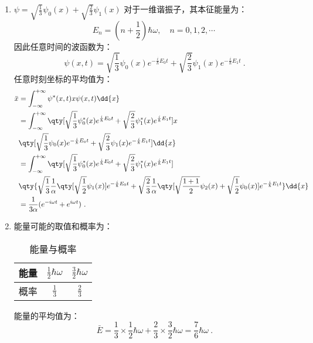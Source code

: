 \subsection{ }
\begin{enumerate}
\item $\psi=\sqrt{\frac{1}{3}}\psi_{0}(x)+\sqrt{\frac{2}{3}}\psi_{1}(x)$
对于一维谐振子，其本征能量为：
\begin{equation}
E_{n}=(n+\frac{1}{2})\hbar \omega,\quad n=0,1,2,\cdots~
\end{equation}
因此任意时间的波函数为：
\begin{equation}
\psi(x,t)=\sqrt{\frac{1}{3}}\psi_{0}(x)e^{-\frac{i}{\hbar}E_{0}t}+\sqrt{\frac{2}{3}}\psi_{1}(x)e^{-\frac{i}{\hbar}E_{1}t}~.
\end{equation}
任意时刻坐标的平均值为：
\begin{equation}
\begin{aligned}
\bar{x}&=\int^{+\infty}_{-\infty}\psi^{*}(x,t)x\psi(x,t)\dd{x} \\
&=\int^{+\infty}_{-\infty} \qty[\sqrt{\frac{1}{3}}\psi^{*}_{0}(x)e^{\frac{i}{\hbar}E_{0}t}+\sqrt{\frac{2}{3}}\psi^{*}_{1}(x)e^{\frac{i}{\hbar}E_{1}t}]x\\
&\qty[\sqrt{\frac{1}{3}}\psi_{0}(x)e^{-\frac{i}{\hbar}E_{0}t}+\sqrt{\frac{2}{3}}\psi_{1}(x)e^{-\frac{i}{\hbar}E_{1}t}]\dd{x} \\
&=\int^{+\infty}_{-\infty} \qty[\sqrt{\frac{1}{3}}\psi^{*}_{0}(x)e^{\frac{i}{\hbar}E_{0}t}+\sqrt{\frac{2}{3}}\psi^{*}_{1}(x)e^{\frac{i}{\hbar}E_{1}t}]\\
&\qty{\sqrt{\frac{1}{3}}\frac{1}{\alpha}\qty[\sqrt{\frac{1}{2}}\psi_{1}(x)]e^{-\frac{i}{\hbar}E_{0}t}+\sqrt{\frac{2}{3}}\frac{1}{\alpha}\qty[\sqrt{\frac{1+1}{2}}\psi_{2}(x)+\sqrt{\frac{1}{2}}\psi_{0}(x)]e^{-\frac{i}{\hbar}E_{1}t}}\dd{x} \\
&=\frac{1}{3\alpha}(e^{-i\omega t}+e^{i\omega t})~.
\end{aligned}
\end{equation}

\item 能量可能的取值和概率为：
\begin{table}[ht]
\centering
\caption{能量与概率}\label{tab_TJU14A_2}
\begin{tabular}{|c|c|c|}
\hline
能量 & $\frac{1}{2}\hbar\omega$ & $\frac{3}{2}\hbar\omega$ \\
\hline
概率 & $\frac{1}{3}$ & $\frac{2}{3}$ \\
\hline
\end{tabular}
\end{table}
能量的平均值为：
\begin{equation}
\bar{E}=\frac{1}{3}\times \frac{1}{2}\hbar\omega + \frac{2}{3}\times \frac{3}{2}\hbar\omega=\frac{7}{6}\hbar\omega~.
\end{equation}
\end{enumerate}
